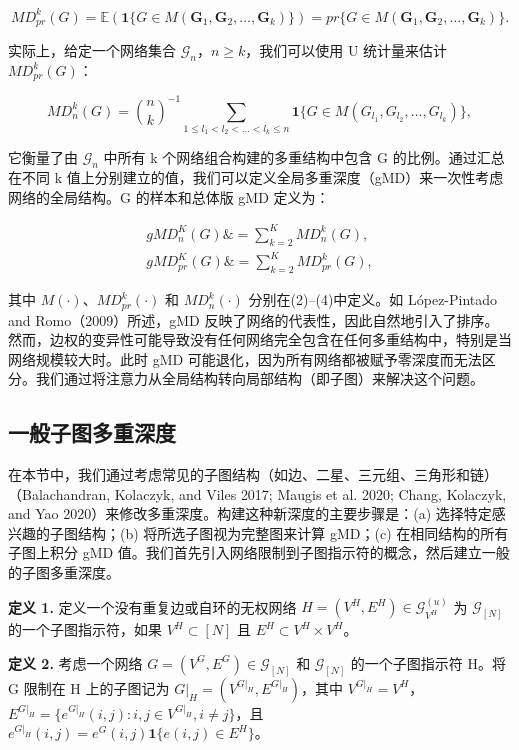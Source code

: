 \documentclass[
  10
]{article}
\begin{document}
$$
MD_{pr}^k(G)=\mathbb{E}(\mathbf{1}\{G\in M(\mathbf{G}_1,\mathbf{G}_2,\dots,\mathbf{G}_k)\})
=pr\{G\in M(\mathbf{G}_1,\mathbf{G}_2,\dots,\mathbf{G}_k)\}.
$$

实际上，给定一个网络集合 $\mathcal{G}_n$，$n\geq k$，我们可以使用 U 统计量来估计 $MD_{pr}^k(G)$：

$$
MD_n^k(G)=\binom{n}{k}^{-1}\sum_{1\leq l_1<l_2<\dots<l_k\leq n}
\mathbf{1}\{G\in M(G_{l_1},G_{l_2},\dots,G_{l_k})\},
$$

它衡量了由 $\mathcal{G}_n$ 中所有 k 个网络组合构建的多重结构中包含 G 的比例。通过汇总在不同 k 值上分别建立的值，我们可以定义全局多重深度（gMD）来一次性考虑网络的全局结构。G 的样本和总体版 gMD 定义为：

$$
\begin{aligned}
gMD_n^K(G) \&= \sum_{k=2}^K MD_n^k(G),\\
gMD_{pr}^K(G) \&= \sum_{k=2}^K MD_{pr}^k(G),
\end{aligned}
$$

其中 $M(\cdot)$、$MD_{pr}^k(\cdot)$ 和 $MD_n^k(\cdot)$ 分别在(2)–(4)中定义。如 López-Pintado and Romo（2009）所述，gMD 反映了网络的代表性，因此自然地引入了排序。然而，边权的变异性可能导致没有任何网络完全包含在任何多重结构中，特别是当网络规模较大时。此时 gMD 可能退化，因为所有网络都被赋予零深度而无法区分。我们通过将注意力从全局结构转向局部结构（即子图）来解决这个问题。

\subsection{一般子图多重深度}

在本节中，我们通过考虑常见的子图结构（如边、二星、三元组、三角形和链）（Balachandran, Kolaczyk, and Viles 2017; Maugis et al. 2020; Chang, Kolaczyk, and Yao 2020）来修改多重深度。构建这种新深度的主要步骤是：(a) 选择特定感兴趣的子图结构；(b) 将所选子图视为完整图来计算 gMD；(c) 在相同结构的所有子图上积分 gMD 值。我们首先引入网络限制到子图指示符的概念，然后建立一般的子图多重深度。

\textbf{定义 1.} 定义一个没有重复边或自环的无权网络 $H=(V^H,E^H)\in\mathcal{G}_{V^H}^{(u)}$ 为 $\mathcal{G}_{[N]}$ 的一个子图指示符，如果 $V^H\subset[N]$ 且 $E^H\subset V^H\times V^H$。

\textbf{定义 2.} 考虑一个网络 $G=(V^G,E^G)\in\mathcal{G}_{[N]}$ 和 $\mathcal{G}_{[N]}$ 的一个子图指示符 H。将 G 限制在 H 上的子图记为 $G|_H=(V^{G|_H},E^{G|_H})$，其中 $V^{G|_H}=V^H$，$E^{G|_H}=\{e^{G|_H}(i,j):i,j\in V^{G|_H},i\neq j\}$，且 $e^{G|_H}(i,j)=e^G(i,j)\mathbf{1}\{e(i,j)\in E^H\}$。
\end{document}
